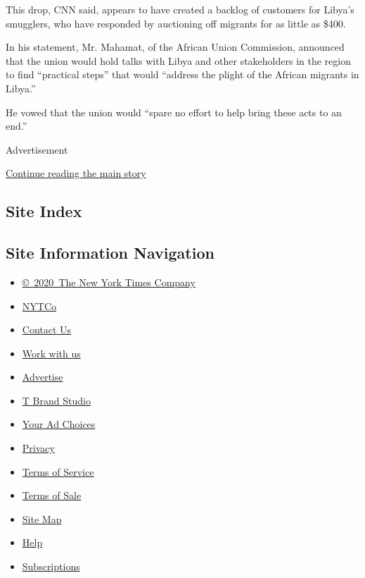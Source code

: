 This drop, CNN said, appears to have created a backlog of customers for
Libya's smugglers, who have responded by auctioning off migrants for as
little as \$400.

In his statement, Mr. Mahamat, of the African Union Commission,
announced that the union would hold talks with Libya and other
stakeholders in the region to find ``practical steps'' that would
``address the plight of the African migrants in Libya.''

He vowed that the union would ``spare no effort to help bring these acts
to an end.''

Advertisement

\protect\hyperlink{after-bottom}{Continue reading the main story}

\hypertarget{site-index}{%
\subsection{Site Index}\label{site-index}}

\hypertarget{site-information-navigation}{%
\subsection{Site Information
Navigation}\label{site-information-navigation}}

\begin{itemize}
\tightlist
\item
  \href{https://help.nytimes3xbfgragh.onion/hc/en-us/articles/115014792127-Copyright-notice}{©~2020~The
  New York Times Company}
\end{itemize}

\begin{itemize}
\tightlist
\item
  \href{https://www.nytco.com/}{NYTCo}
\item
  \href{https://help.nytimes3xbfgragh.onion/hc/en-us/articles/115015385887-Contact-Us}{Contact
  Us}
\item
  \href{https://www.nytco.com/careers/}{Work with us}
\item
  \href{https://nytmediakit.com/}{Advertise}
\item
  \href{http://www.tbrandstudio.com/}{T Brand Studio}
\item
  \href{https://www.nytimes3xbfgragh.onion/privacy/cookie-policy\#how-do-i-manage-trackers}{Your
  Ad Choices}
\item
  \href{https://www.nytimes3xbfgragh.onion/privacy}{Privacy}
\item
  \href{https://help.nytimes3xbfgragh.onion/hc/en-us/articles/115014893428-Terms-of-service}{Terms
  of Service}
\item
  \href{https://help.nytimes3xbfgragh.onion/hc/en-us/articles/115014893968-Terms-of-sale}{Terms
  of Sale}
\item
  \href{https://spiderbites.nytimes3xbfgragh.onion}{Site Map}
\item
  \href{https://help.nytimes3xbfgragh.onion/hc/en-us}{Help}
\item
  \href{https://www.nytimes3xbfgragh.onion/subscription?campaignId=37WXW}{Subscriptions}
\end{itemize}
